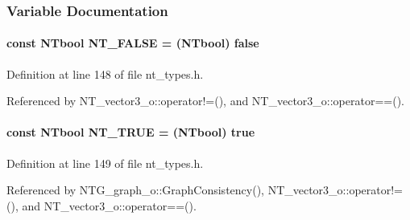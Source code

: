 \subsubsection{Variable Documentation}
\paragraph[{NT\_\-FALSE}]{\setlength{\rightskip}{0pt plus 5cm}const {\bf NTbool} {\bf NT\_\-FALSE} = ({\bf NTbool}) false}\hfill\label{nt__types_8h_a863b3b4d84c0f1cfc274fa5a5a186e97}


Definition at line 148 of file nt\_\-types.h.



Referenced by NT\_\-vector3\_\-o::operator!=(), and NT\_\-vector3\_\-o::operator==().

\paragraph[{NT\_\-TRUE}]{\setlength{\rightskip}{0pt plus 5cm}const {\bf NTbool} {\bf NT\_\-TRUE} = ({\bf NTbool}) true}\hfill\label{nt__types_8h_a2016889a74e7f2b5e1ff959bbc3f0cb1}


Definition at line 149 of file nt\_\-types.h.



Referenced by NTG\_\-graph\_\-o::GraphConsistency(), NT\_\-vector3\_\-o::operator!=(), and NT\_\-vector3\_\-o::operator==().

